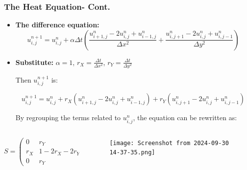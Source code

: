 \documentclass[9pt]{beamer}
\begin{document}
\begin{frame}
\vspace{-0.1\baselineskip} %

\frametitle{The Heat Equation- Cont.}
\scriptsize
\begin{itemize}
\item \textbf{The difference equation:}
\[
u_{i,j}^{n+1} = u_{i,j}^n + \alpha \Delta t \left( \frac{u_{i+1,j}^n - 2u_{i,j}^n + u_{i-1,j}^n}{\Delta x^2} + \frac{u_{i,j+1}^n - 2u_{i,j}^n + u_{i,j-1}^n}{\Delta y^2} \right)
\]
\item \textbf{Substitute:}
\vspace{0.3\baselineskip}
 \( \alpha = 1 \), \( r_X = \frac{\Delta t}{\Delta x^2} \), \( r_Y = \frac{\Delta t}{\Delta y^2} \)

Then \( u_{i,j}^{n+1} \) is:

\[
u_{i,j}^{n+1} = u_{i,j}^n + r_X \left( u_{i+1,j}^n - 2u_{i,j}^n + u_{i-1,j}^n \right) + r_Y \left( u_{i,j+1}^n - 2u_{i,j}^n + u_{i,j-1}^n \right)
\]

By regrouping the terms related to \( u_{i,j}^n \), the equation can be rewritten as:
\end{itemize}
\begin{columns}
\begin{column}{0.40\textwidth}
\[
S= \begin{pmatrix}
0   & r_{Y}   & 0 \\
r_{X}  & 1 - 2r_{X} - 2r_{Y}  & r_{X} \\
0   & r_{Y}   & 0
\end{pmatrix}
\]
\end{column}

\begin{column}{0.60\textwidth}
\begin{figure}
    \centering
    \texttt{[image: Screenshot from 2024-09-30 14-37-35.png]}
\end{figure}
\end{column}
\end{columns}
\end{frame}
\end{document}
